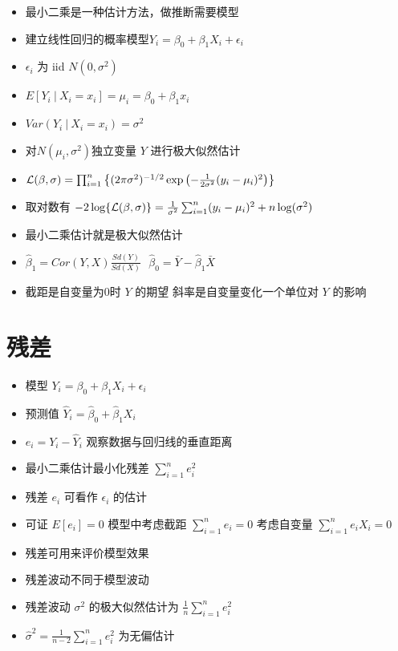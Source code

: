 \documentclass[
]{book}
\providecommand{\tightlist}{%
  \setlength{\itemsep}{0pt}\setlength{\parskip}{0pt}}
\begin{document}
\begin{itemize}
\tightlist
\item
  最小二乘是一种估计方法，做推断需要模型
\item
  建立线性回归的概率模型\(Y_i = \beta_0 + \beta_1 X_i + \epsilon_{i}\)
\item
  \(\epsilon_{i}\) 为 iid \(N(0, \sigma^2)\)
\item
  \(E[Y_i ~|~ X_i = x_i] = \mu_i = \beta_0 + \beta_1 x_i\)
\item
  \(Var(Y_i ~|~ X_i = x_i) = \sigma^2\)
\item
  对\(N(\mu_i, \sigma^2)\)独立变量 \(Y\) 进行极大似然估计
\item
  \({\cal L}(\beta, \sigma) = \prod_{i=1}^n \left\{(2 \pi \sigma^2)^{-1/2}\exp\left(-\frac{1}{2\sigma^2}(y_i - \mu_i)^2 \right) \right\}\)
\item
  取对数有 \(-2 \log\{ {\cal L}(\beta, \sigma) \} = \frac{1}{\sigma^2} \sum_{i=1}^n (y_i - \mu_i)^2 + n\log(\sigma^2)\)
\item
  最小二乘估计就是极大似然估计
\item
  \(\hat \beta_1 = Cor(Y, X) \frac{Sd(Y)}{Sd(X)} ~~~ \hat \beta_0 = \bar Y - \hat \beta_1 \bar X\)
\item
  截距是自变量为0时 \(Y\) 的期望 斜率是自变量变化一个单位对 \(Y\) 的影响
\end{itemize}

\hypertarget{ux6b8bux5dee}{%
\section{残差}\label{ux6b8bux5dee}}

\begin{itemize}
\tightlist
\item
  模型 \(Y_i = \beta_0 + \beta_1 X_i + \epsilon_i\)
\item
  预测值 \(\hat Y_i = \hat \beta_0 + \hat \beta_1 X_i\)
\item
  \(e_i = Y_i - \hat Y_i\) 观察数据与回归线的垂直距离
\item
  最小二乘估计最小化残差 \(\sum_{i=1}^n e_i^2\)
\item
  残差 \(e_i\) 可看作 \(\epsilon_i\) 的估计
\item
  可证 \(E[e_i] = 0\) 模型中考虑截距 \(\sum_{i=1}^n e_i = 0\) 考虑自变量 \(\sum_{i=1}^n e_i X_i = 0\)
\item
  残差可用来评价模型效果
\item
  残差波动不同于模型波动
\item
  残差波动 \(\sigma^2\) 的极大似然估计为 \(\frac{1}{n}\sum_{i=1}^n e_i^2\)
\item
  \(\hat \sigma^2 = \frac{1}{n-2}\sum_{i=1}^n e_i^2\) 为无偏估计
\end{itemize}
\end{document}
